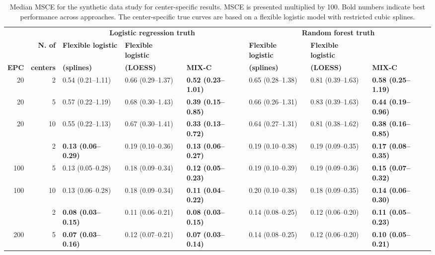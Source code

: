 \begin{table}
\centering
\footnotesize
\setlength{\tabcolsep}{4pt}
\begin{threeparttable}
\caption[Median MSCE for center-specific results in the synthetic data]{Median MSCE for the synthetic data study for center-specific results. MSCE is presented multiplied by 100. Bold numbers indicate best performance across approaches. The center-specific true curves are based on a flexible logistic model with restricted cubic splines.}
\label{tab:4:4}
\begin{tabular}{rr lll lll}
\toprule
& & \multicolumn{3}{c}{\textbf{Logistic regression truth}} & \multicolumn{3}{c}{\textbf{Random forest truth}} \\
\cmidrule(lr){3-5} \cmidrule(lr){6-8}
& \textbf{N. of} & \textbf{Flexible logistic} & \textbf{Flexible logistic} & & \textbf{Flexible logistic} & \textbf{Flexible logistic} & \\
\textbf{EPC} & \textbf{centers} & \textbf{(splines)} & \textbf{(LOESS)} & \textbf{MIX-C} & \textbf{(splines)} & \textbf{(LOESS)} & \textbf{MIX-C} \\
\midrule
20 & 2 & 0.54 (0.21--1.11) & 0.66 (0.29--1.37) & \textbf{0.52 (0.23--1.01)} & 0.65 (0.28--1.38) & 0.81 (0.39--1.63) & \textbf{0.58 (0.25--1.19)} \\
20 & 5 & 0.57 (0.22--1.19) & 0.68 (0.30--1.43) & \textbf{0.39 (0.15--0.85)} & 0.66 (0.26--1.31) & 0.83 (0.39--1.63) & \textbf{0.44 (0.19--0.96)} \\
20 & 10 & 0.55 (0.22--1.13) & 0.67 (0.30--1.41) & \textbf{0.33 (0.13--0.72)} & 0.64 (0.27--1.31) & 0.81 (0.38--1.62) & \textbf{0.38 (0.16--0.85)} \\
\addlinespace
100 & 2 & \textbf{0.13 (0.06--0.29)} & 0.19 (0.10--0.36) & \textbf{0.13 (0.06--0.27)} & 0.19 (0.10--0.38) & 0.19 (0.09--0.35) & \textbf{0.17 (0.08--0.35)} \\
100 & 5 & 0.13 (0.05--0.28) & 0.18 (0.09--0.34) & \textbf{0.12 (0.05--0.23)} & 0.19 (0.10--0.39) & 0.19 (0.09--0.36) & \textbf{0.15 (0.07--0.32)} \\
100 & 10 & 0.13 (0.06--0.28) & 0.18 (0.09--0.34) & \textbf{0.11 (0.04--0.22)} & 0.20 (0.10--0.38) & 0.18 (0.09--0.35) & \textbf{0.14 (0.06--0.30)} \\
\addlinespace
200 & 2 & \textbf{0.08 (0.03--0.15)} & 0.11 (0.06--0.21) & \textbf{0.08 (0.03--0.15)} & 0.14 (0.08--0.25) & 0.12 (0.06--0.20) & \textbf{0.11 (0.05--0.23)} \\
200 & 5 & \textbf{0.07 (0.03--0.16)} & 0.12 (0.07--0.21) & \textbf{0.07 (0.03--0.14)} & 0.14 (0.08--0.25) & 0.12 (0.06--0.20) & \textbf{0.10 (0.05--0.21)} \\

\end{tabular}
\end{threeparttable}
\end{table}
